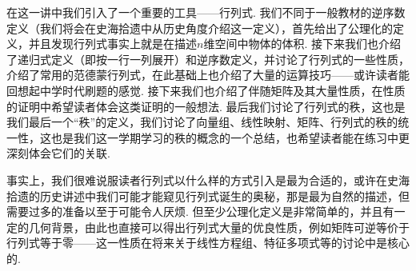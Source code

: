 \begin{summary}

    在这一讲中我们引入了一个重要的工具——行列式. 我们不同于一般教材的逆序数定义（我们将会在史海拾遗中从历史角度介绍这一定义），首先给出了公理化的定义，并且发现行列式事实上就是在描述$n$维空间中物体的体积. 接下来我们也介绍了递归式定义（即按一行一列展开）和逆序数定义，并讨论了行列式的一些性质，介绍了常用的范德蒙行列式，在此基础上也介绍了大量的运算技巧——或许读者能回想起中学时代刷题的感觉. 接下来我们也介绍了伴随矩阵及其大量性质，在性质的证明中希望读者体会这类证明的一般想法. 最后我们讨论了行列式的秩，这也是我们最后一个``秩''的定义，我们讨论了向量组、线性映射、矩阵、行列式的秩的统一性，这也是我们这一学期学习的秩的概念的一个总结，也希望读者能在练习中更深刻体会它们的关联.

    事实上，我们很难说服读者行列式以什么样的方式引入是最为合适的，或许在史海拾遗的历史讲述中我们可能才能窥见行列式诞生的奥秘，那是最为自然的描述，但需要过多的准备以至于可能令人厌烦. 但至少公理化定义是非常简单的，并且有一定的几何背景，由此也直接可以得出行列式大量的优良性质，例如矩阵可逆等价于行列式等于零——这一性质在将来关于线性方程组、特征多项式等的讨论中是核心的.

\end{summary}

